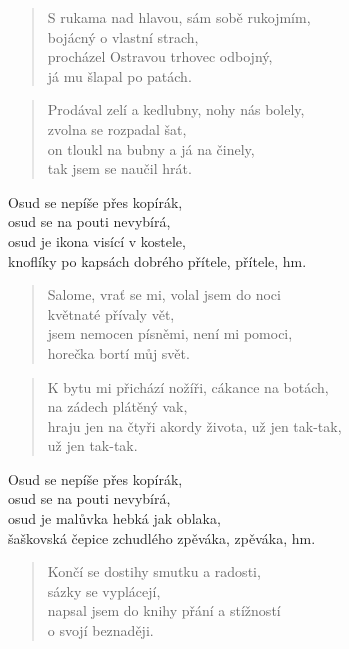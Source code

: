 \begin{song}{}
\begin{verse}
   S rukama nad hlavou, sám sobě rukojmím, \\
   bojácný o vlastní strach, \\
   procházel Ostravou trhovec odbojný, \\
   já mu šlapal po patách.
\end{verse}
\begin{verse}
   Prodával zelí a kedlubny, nohy nás bolely, \\
   zvolna se rozpadal šat, \\
   on tloukl na bubny a já na činely, \\
   tak jsem se naučil hrát.
\end{verse}
\begin{refren}
   Osud se nepíše přes kopírák, \\
   osud se na pouti nevybírá, \\
   osud je ikona visící v kostele, \\
   knoflíky po kapsách dobrého přítele, přítele, hm.
\end{refren}
\begin{verse}
   Salome, vrať se mi, volal jsem do noci \\
   květnaté přívaly vět, \\
   jsem nemocen písněmi, není mi pomoci, \\
   horečka bortí můj svět.
\end{verse}
\begin{verse}
   K bytu mi přichází nožíři, cákance na botách, \\
   na zádech plátěný vak, \\
   hraju jen na čtyři akordy života, už jen tak-tak, \\
   už jen tak-tak.
\end{verse}
\begin{refren}
   Osud se nepíše přes kopírák, \\
   osud se na pouti nevybírá, \\
   osud je malůvka hebká jak oblaka, \\
   šaškovská čepice zchudlého zpěváka, zpěváka, hm.
\end{refren}
\begin{verse}
   Končí se dostihy smutku a radosti, \\
   sázky se vyplácejí, \\
   napsal jsem do knihy přání a stížností \\
   o svojí beznaději.
\end{verse}

\end{song}
